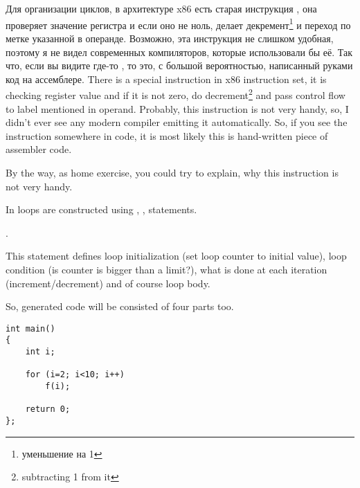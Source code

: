 ﻿%

\section{}

\IFRU
{Для организации циклов, в архитектуре x86 есть старая инструкция \LOOP, 
она проверяет значение регистра \ECX и если оно не ноль, делает декремент\footnote{уменьшение на 1} \ECX и переход 
по метке указанной в операнде. 
Возможно, эта инструкция не слишком удобная, поэтому я не видел современных компиляторов, 
которые использовали бы её. Так что, если вы видите где-то \LOOP, то это, с большой вероятностью, 
написанный руками код на ассемблере.}
{There is a special \LOOP instruction in x86 instruction set, it is checking \ECX register value and 
if it is not zero, do \ECX decrement\footnote{subtracting 1 from it} and pass control flow to label mentioned in \LOOP operand. 
Probably, this instruction is not very handy, so, I didn't ever see any modern compiler emitting it automatically. 
So, if you see the instruction somewhere in code, it is most likely this is hand-written piece of assembler code.}

{By the way, as home exercise, you could try to explain, why this instruction is not very handy.}

{In \CCpp loops are constructed using , ,  statements.}

 .

{This statement defines loop initialization (set loop counter to initial value), 
loop condition (is counter is bigger than a limit?), what is done at each iteration (increment/decrement) 
and of course loop body.}

\IFRU{}{}

{So, generated code will be consisted of four parts too.}


\begin{lstlisting}
int main()
{
	int i;

	for (i=2; i<10; i++)
		f(i);

	return 0;
};
\end{lstlisting}

